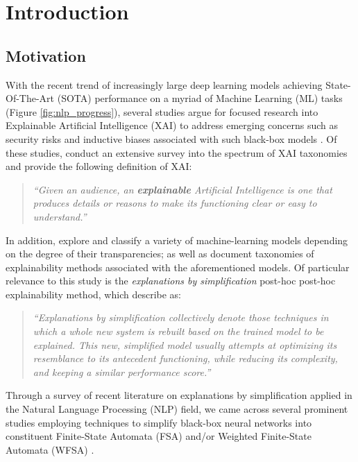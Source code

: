\chapter{Introduction}

\label{introduction}

\section{Motivation}

With the recent trend of increasingly large deep learning models achieving State-Of-The-Art (SOTA) performance on a myriad of Machine Learning (ML) tasks (Figure \ref{fig:nlp_progress}), several studies argue for focused research into Explainable Artificial Intelligence (XAI) to address emerging concerns such as security risks and inductive biases associated with such black-box models \citep{doran2017does,townsend2019extracting,danilevsky2020survey,arrieta2020explainable}. Of these studies, \citet{arrieta2020explainable} conduct an extensive survey into the spectrum of XAI taxonomies and provide the following definition of XAI:

\begin{quote}
  \textit{``Given an audience, an \textbf{explainable} Artificial Intelligence is one that produces details or reasons to make its functioning clear or easy to understand.''}
\end{quote}

In addition, \citet{arrieta2020explainable} explore and classify a variety of machine-learning models depending on the degree of their transparencies; as well as document taxonomies of explainability methods associated with the aforementioned models. Of particular relevance to this study is the \textit{explanations by simplification} post-hoc post-hoc explainability method, which \citet{arrieta2020explainable} describe as:

\begin{quote}
\textit{``Explanations by simplification collectively denote those techniques in which a whole new system is rebuilt based on the trained model to be explained. This new, simplified model usually attempts at optimizing its resemblance to its antecedent functioning, while reducing its complexity, and keeping a similar performance score.''} 
\end{quote}

Through a survey of recent literature on explanations by simplification applied in the Natural Language Processing (NLP) field, we came across several prominent studies employing techniques to simplify black-box neural networks into constituent Finite-State Automata (FSA) and/or Weighted Finite-State Automata (WFSA) \citep{schwartz2018sopa,peng2018rational,DBLP:journals/corr/abs-1905-08701,wang2019state,jiang2020cold}.

